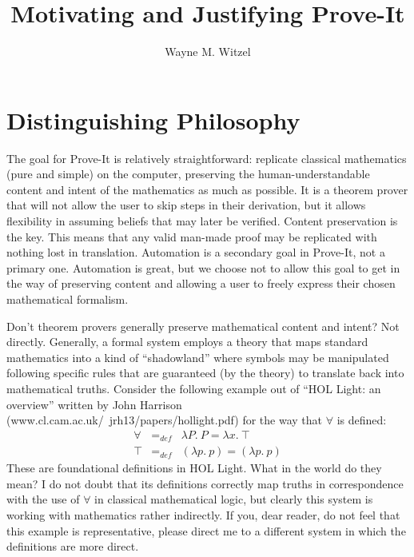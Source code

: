 \documentclass[12pt]{article}
\begin{document}
\title{Motivating and Justifying Prove-It}
\author{Wayne M. Witzel}

\maketitle

\section{Distinguishing Philosophy}

The goal for Prove-It is relatively straightforward: replicate classical mathematics (pure and simple) on the computer, preserving the human-understandable content and intent of the mathematics as much as possible.  It is a theorem prover that will not allow the user to skip steps in their derivation, but it allows flexibility in assuming beliefs that may later be verified.  Content preservation is the key.  This means that any valid man-made proof may be replicated with nothing lost in translation.  Automation is a secondary goal in Prove-It, not a primary one.  Automation is great, but we choose not to allow this goal to get in the way of preserving content and allowing a user to freely express their chosen mathematical formalism.

Don't theorem provers generally preserve mathematical content and intent?  Not directly.  Generally, a formal system employs a theory that maps standard mathematics into a kind of ``shadowland'' where symbols may be manipulated following specific rules that are guaranteed (by the theory) to translate back into mathematical truths.  Consider the following example out of ``HOL Light: an overview'' written by John Harrison (www.cl.cam.ac.uk/~jrh13/papers/hollight.pdf) for the way that $\forall$ is defined:
\begin{eqnarray}
  \forall &=_{def}& \lambda P.~P = \lambda x.~\top \\
  \top &=_{def}&  (\lambda p.~p) = (\lambda p.~p)
\end{eqnarray}
These are foundational definitions in HOL Light.  What in the world do they mean?  I do not doubt that its definitions correctly map truths in correspondence with the use of $\forall$ in classical mathematical logic, but clearly this system is working with mathematics rather indirectly.  If you, dear reader, do not feel that this example is representative, please direct me to a different system in which the definitions are more direct.
\end{document}
